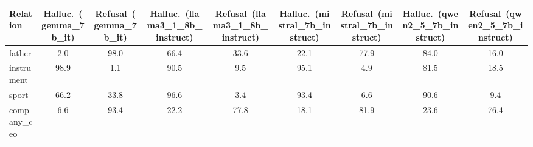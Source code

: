\begin{tabular}{lcccccccc}
\toprule
Relation & Halluc.~(gemma_7b_it) & Refusal~(gemma_7b_it) & Halluc.~(llama3_1_8b_instruct) & Refusal~(llama3_1_8b_instruct) & Halluc.~(mistral_7b_instruct) & Refusal~(mistral_7b_instruct) & Halluc.~(qwen2_5_7b_instruct) & Refusal~(qwen2_5_7b_instruct) \\
\midrule
father & 2.0 & 98.0 & 66.4 & 33.6 & 22.1 & 77.9 & 84.0 & 16.0 \\
instrument & 98.9 & 1.1 & 90.5 & 9.5 & 95.1 & 4.9 & 81.5 & 18.5 \\
sport & 66.2 & 33.8 & 96.6 & 3.4 & 93.4 & 6.6 & 90.6 & 9.4 \\
company\_ceo & 6.6 & 93.4 & 22.2 & 77.8 & 18.1 & 81.9 & 23.6 & 76.4 \\
\bottomrule
\end{tabular}